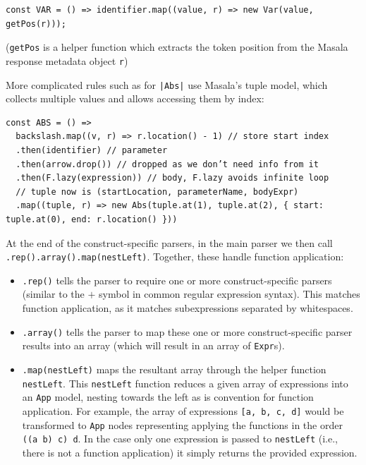 \documentclass[a4paper,fleqn,oneside,12pt]{report}
\begin{document}
\begin{verbatim}
const VAR = () => identifier.map((value, r) => new Var(value, getPos(r)));
\end{verbatim}
(\texttt{getPos} is a helper function which extracts the token position from the Masala response metadata object \texttt{r})

More complicated rules such as for \texttt{|Abs|} use Masala’s tuple model, which collects multiple values and allows accessing them by index:

\begin{verbatim}
const ABS = () =>
  backslash.map((v, r) => r.location() - 1) // store start index
  .then(identifier) // parameter
  .then(arrow.drop()) // dropped as we don’t need info from it
  .then(F.lazy(expression)) // body, F.lazy avoids infinite loop
  // tuple now is (startLocation, parameterName, bodyExpr)
  .map((tuple, r) => new Abs(tuple.at(1), tuple.at(2), { start: tuple.at(0), end: r.location() }))
\end{verbatim}
At the end of the construct-specific parsers, in the main parser we then call \texttt{.rep().array().map(nestLeft)}. Together, these handle function application:
\begin{itemize}
  \item \texttt{.rep()} tells the parser to require one or more construct-specific parsers (similar to the $+$ symbol in common regular expression syntax). This matches function application, as it matches subexpressions separated by whitespaces.
  \item \texttt{.array()} tells the parser to map these one or more construct-specific parser results into an array (which will result in an array of \texttt{Expr}s).
  \item \texttt{.map(nestLeft)} maps the resultant array through the helper function \texttt{nestLeft}. This \texttt{nestLeft} function reduces a given array of expressions into an \texttt{App} model, nesting towards the left as is convention for function application. For example, the array of expressions \texttt{[a, b, c, d]} would be transformed to \texttt{App} nodes representing applying the functions in the order \texttt{((a b) c) d}. In the case only one expression is passed to \texttt{nestLeft} (i.e., there is not a function application) it simply returns the provided expression.
\end{itemize}
\end{document}
